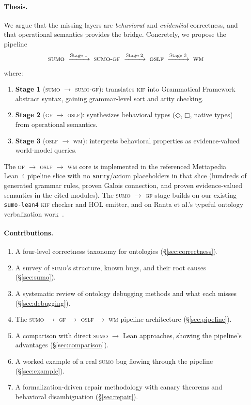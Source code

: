 \documentclass[11pt]{article}
\newcommand{\DiamondOp}{\mathbin{\Diamond}}
\newcommand{\BoxOp}{\mathbin{\Box}}
\newcommand{\KIF}{\textsc{kif}}
\newcommand{\SUMO}{\textsc{sumo}}
\newcommand{\GF}{\textsc{gf}}
\newcommand{\OSLF}{\textsc{oslf}}
\newcommand{\WM}{\textsc{wm}}
\theoremstyle{definition}
\theoremstyle{plain}
\begin{document}
\paragraph{Thesis.}
We argue that the missing layers are \emph{behavioral} and \emph{evidential}
correctness, and that operational semantics provides the bridge.
Concretely, we propose the pipeline
\[
  \SUMO{} \;\xrightarrow{\text{Stage 1}}\; \SUMO\text{-}\GF{}
  \;\xrightarrow{\text{Stage 2}}\; \OSLF{}
  \;\xrightarrow{\text{Stage 3}}\; \WM{}
\]
where:
\begin{enumerate}[nosep]
  \item \textbf{Stage 1} (\SUMO{} $\to$ \SUMO{}-\GF{}): translates \KIF{}
    into Grammatical Framework abstract syntax, gaining grammar-level
    sort and arity checking.
  \item \textbf{Stage 2} (\GF{} $\to$ \OSLF{}): synthesizes behavioral types
    ($\DiamondOp$, $\BoxOp$, native types) from operational semantics.
  \item \textbf{Stage 3} (\OSLF{} $\to$ \WM{}): interprets behavioral
    properties as evidence-valued world-model queries.
\end{enumerate}

The \GF{} $\to$ \OSLF{} $\to$ \WM{} core is implemented in the referenced
Mettapedia Lean~4 pipeline slice with no \texttt{sorry}/axiom placeholders in
that slice (hundreds of generated grammar rules, proven Galois connection, and
proven evidence-valued semantics in the cited modules).
The \SUMO{} $\to$ \GF{} stage builds on our existing \texttt{sumo-lean4}
\KIF{} checker and HOL emitter, and on Ranta et al.'s typeful ontology
verbalization work~\cite{ranta-typeful-ontologies}.

\paragraph{Contributions.}
\begin{enumerate}[nosep]
  \item A four-level correctness taxonomy for ontologies (\S\ref{sec:correctness}).
  \item A survey of \SUMO{}'s structure, known bugs, and their root causes
    (\S\ref{sec:sumo}).
  \item A systematic review of ontology debugging methods and what each
    misses (\S\ref{sec:debugging}).
  \item The \SUMO{} $\to$ \GF{} $\to$ \OSLF{} $\to$ \WM{} pipeline
    architecture (\S\ref{sec:pipeline}).
  \item A comparison with direct \SUMO{} $\to$ Lean approaches, showing
    the pipeline's advantages (\S\ref{sec:comparison}).
  \item A worked example of a real \SUMO{} bug flowing through the
    pipeline (\S\ref{sec:example}).
  \item A formalization-driven repair methodology with canary theorems
    and behavioral disambiguation (\S\ref{sec:repair}).
\end{enumerate}
\end{document}
